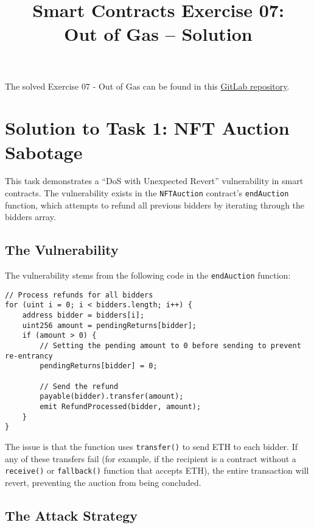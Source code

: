 \documentclass[12pt]{article}
\title{Smart Contracts Exercise 07: \\ Out of Gas -- Solution}
\author{}
\date{}
\begin{document}
\maketitle

\noindent
The solved Exercise 07 - Out of Gas can be found in this \href{https://gitlab.fel.cvut.cz/radovluk/smart-contracts-exercises/-/tree/main/07-Out-of-Gas/solution/solution-code?ref_type=heads}{GitLab repository}.

\section*{Solution to Task 1: NFT Auction Sabotage}

This task demonstrates a ``DoS with Unexpected Revert'' vulnerability in smart contracts. The vulnerability exists in the \texttt{NFTAuction} contract's \texttt{endAuction} function, which attempts to refund all previous bidders by iterating through the bidders array. 

\subsection*{The Vulnerability}

The vulnerability stems from the following code in the \texttt{endAuction} function:

\noindent
\begin{minipage}{\textwidth}
\begin{lstlisting}[language=Solidity]
// Process refunds for all bidders
for (uint i = 0; i < bidders.length; i++) {
    address bidder = bidders[i];
    uint256 amount = pendingReturns[bidder];
    if (amount > 0) {
        // Setting the pending amount to 0 before sending to prevent re-entrancy
        pendingReturns[bidder] = 0;

        // Send the refund
        payable(bidder).transfer(amount);
        emit RefundProcessed(bidder, amount);
    }
}
\end{lstlisting}
\end{minipage}

The issue is that the function uses \texttt{transfer()} to send ETH to each bidder. If any of these transfers fail (for example, if the recipient is a contract without a \texttt{receive()} or \texttt{fallback()} function that accepts ETH), the entire transaction will revert, preventing the auction from being concluded.

\subsection*{The Attack Strategy}
\end{document}
